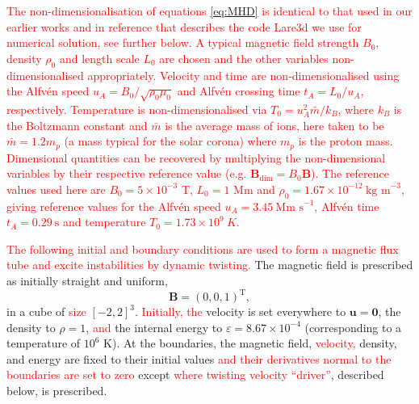 \documentclass[12pt]{article}
\newcommand{\rs}[2]{\textcolor{red}{#2}}
\renewcommand{\vec}[1]{{\bm #1}}
\begin{document}
\rs{The non-dimensionalisation scheme and values align with the scheme
used by Lare3d~\cite{arberStaggeredGridLagrangian2001} and are
identical to those used
in~\cite{quinnEffectAnisotropicViscosity2020a}.}
   {
The non-dimensionalisation of equations \eqref{eq:MHD} is identical to that used in
our earlier works
\cite{quinnEffectAnisotropicViscosity2020a,Quinn2021} and in reference
\cite{arberStaggeredGridLagrangian2001} that describes the code Lare3d
we use for numerical solution, see further below. A typical magnetic
field strength $B_0$, density $\rho_0$ and length scale $L_0$ are
chosen and the other variables non-dimensionalised
appropriately. Velocity and time are non-dimensionalised using the
Alfv\'en speed $u_A = B_0 / \sqrt{\rho_0 \mu_0}$ and Alfv\'en crossing 
time $t_A = L_0/u_A$, respectively. Temperature is non-dimensionalised
via $T_0 = u_A^2 \bar{m} / k_B$, where $k_B$ is the Boltzmann constant
and $\bar{m}$ is the average mass of ions, here taken to be $\bar{m} =
1.2m_p$ (a mass typical for the solar corona) where $m_p$ is the
proton mass. Dimensional quantities can be recovered by multiplying
the non-dimensional variables by their respective reference value
(e.g. $\vec{B}_{\dim} = B_0 \vec{B}$). The reference values used here
are $B_0 = 5 \times 10^{-3}$ T, $L_0 = 1$ Mm and $\rho_0 = 1.67 \times
10^{-12} \ \text{kg m}^{-3}$, giving reference values for the Alfv\'en
speed $u_A = 3.45\ \text{Mm s}^{-1}$, Alfv\'en time $t_A =
0.29\ \text{s}$ and temperature $T_0 = 1.73 \times 10^{9}\ K$.      
   }



\rs{}{The following initial and boundary conditions are used to form a
magnetic flux tube and excite instabilities by dynamic twisting.} 
The magnetic field is prescribed as initially straight and uniform,
\begin{equation}
\vec{B} = (0, 0, 1)^{\text{T}},
\end{equation}
in a cube of \rs{dimension}{size} $[-2,2]^3$. \rs{The}{Initially, the} velocity is set
everywhere to $\vec{u} = \vec{0}$, the density to $\rho = 1$,
\rs{}{and} the
internal energy to $\varepsilon = 8.67\times 10^{-4}$ (corresponding
to a temperature of $10^6$ K).  At the
boundaries, the magnetic field, \rs{}{velocity,} density, and energy are fixed to their
initial values \rs{}{and their derivatives normal to the
boundaries are set to zero} \rs{and the velocity to zero}{} except
\rs{the boundaries}{where twisting velocity ``driver''}, described
below, is prescribed.
\rs{The spatial
derivatives of these variables are also set to zero at the
boundaries.}{} \rs{The resolution is $512$ grid points per dimension,
comparable to the highest resolution kink instability studies
of~\cite{hoodCoronalHeatingMagnetic2009} or medium resolution studies
of~\cite{barefordShockHeatingNumerical2015}.}{}
\end{document}
